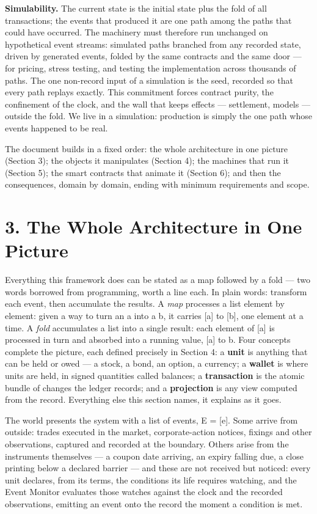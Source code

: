 \documentclass[11pt,a4paper]{article}
\newcommand{\clabel}[1]{\leavevmode\hypertarget{clause-#1}{}%
  \marginpar{\raggedright\scriptsize\ttfamily\textcolor{gray}{#1}}}
\begin{document}
\clabel{C-2.8}\textbf{Simulability.} The current state is the initial
state plus the fold of all transactions; the events that produced it are
one path among the paths that could have occurred. The machinery must
therefore run unchanged on hypothetical event streams: simulated paths
branched from any recorded state, driven by generated events, folded by
the same contracts and the same door --- for pricing, stress testing,
and testing the implementation across thousands of paths. The one
non-record input of a simulation is the seed, recorded so that every
path replays exactly. This commitment forces contract purity, the
confinement of the clock, and the wall that keeps effects --- settlement,
models --- outside the fold. We live in a simulation: production is
simply the one path whose events happened to be real.

The document builds in a fixed order: the whole architecture in one
picture (Section 3); the objects it manipulates (Section 4); the
machines that run it (Section 5); the smart contracts that animate it
(Section 6); and then the consequences, domain by domain, ending with
minimum requirements and scope.

\hypertarget{the-whole-architecture-in-one-picture}{%
\section{3. The Whole Architecture in One
Picture}\label{the-whole-architecture-in-one-picture}}

\clabel{C-3.1}Everything this framework does can be stated as a map followed by a fold
--- two words borrowed from programming, worth a line each. In plain
words: transform each event, then accumulate the results. A \emph{map}
processes a list element by element: given a way to turn an a into a b,
it carries {[}a{]} to {[}b{]}, one element at a time. A \emph{fold}
accumulates a list into a single result: each element of {[}a{]} is
processed in turn and absorbed into a running value, {[}a{]} to b. Four
concepts complete the picture, each defined precisely in Section 4: \clabel{C-3.2}a
\textbf{unit} is anything that can be held or owed --- a stock, a bond,
an option, a currency; a \textbf{wallet} is where units are held, in
signed quantities called balances; a \textbf{transaction} is the atomic
bundle of changes the ledger records; and a \textbf{projection} is any
view computed from the record. Everything else this section names, it
explains as it goes.

The world presents the system with a list of events, E = {[}e{]}. Some
arrive from outside: trades executed in the market, corporate-action
notices, fixings and other observations, captured and recorded at the
boundary. Others arise from the instruments themselves --- a coupon date
arriving, an expiry falling due, a close printing below a declared
barrier --- and these are not received but noticed: \clabel{C-3.3}every unit declares,
from its terms, the conditions its life requires watching, and the Event
Monitor evaluates those watches against the clock and the recorded
observations, emitting an event onto the record the moment a condition
is met.
\end{document}
